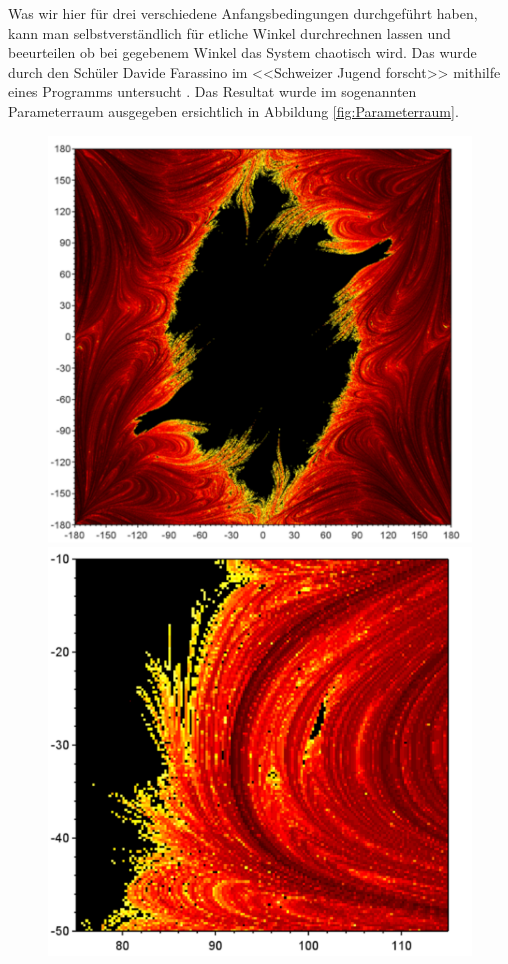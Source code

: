 Was wir hier für drei verschiedene Anfangsbedingungen durchgeführt haben, kann man selbstverständlich
für etliche Winkel durchrechnen lassen und beeurteilen ob bei gegebenem Winkel das System chaotisch wird.
Das wurde durch den Schüler Davide Farassino im <<Schweizer Jugend forscht>> 
mithilfe eines Programms untersucht \cite{doppelpendel:wettbewerbsarbeit}.
Das Resultat wurde im sogenannten Parameterraum ausgegeben
ersichtlich in Abbildung \ref{fig:Parameterraum}.
\begin{figure}
    \centering
    \begin{minipage}{0.45\textwidth}
        \centering
        \includegraphics[width=\textwidth]{papers/doppelpendel/images/parameterraum.png}
    \end{minipage}
    \hfill
    \begin{minipage}{0.45\textwidth}
        \centering
        \includegraphics[width=\textwidth]{papers/doppelpendel/images/parameterraum_stabile_inseln.png}

\end{minipage}
\end{figure}
